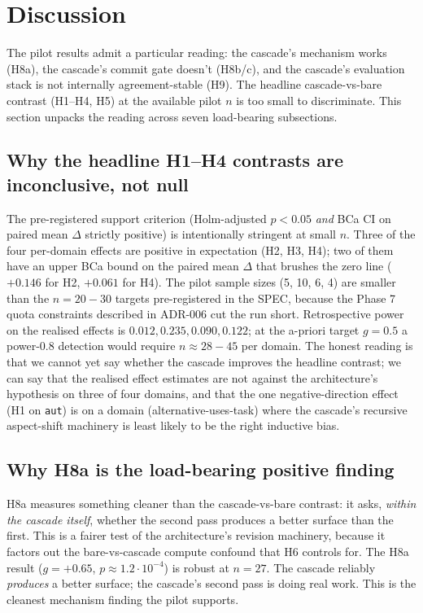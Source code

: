 \section{Discussion}\label{sec:discussion}

\sloppy

The pilot results admit a particular reading: the cascade's mechanism works (H8a), the cascade's commit gate doesn't (H8b/c), and the cascade's evaluation stack is not internally agreement-stable (H9). The headline cascade-vs-bare contrast (H1--H4, H5) at the available pilot $n$ is too small to discriminate. This section unpacks the reading across seven load-bearing subsections.

\subsection{Why the headline H1--H4 contrasts are inconclusive, not null}

The pre-registered support criterion (Holm-adjusted $p<0.05$ \emph{and} BCa CI on paired mean $\Delta$ strictly positive) is intentionally stringent at small $n$. Three of the four per-domain effects are positive in expectation (H2, H3, H4); two of them have an upper BCa bound on the paired mean $\Delta$ that brushes the zero line ($+0.146$ for H2, $+0.061$ for H4). The pilot sample sizes (5, 10, 6, 4) are smaller than the $n=20{-}30$ targets pre-registered in the SPEC, because the Phase 7 quota constraints described in ADR-006 cut the run short. Retrospective power on the realised effects is $0.012, 0.235, 0.090, 0.122$; at the a-priori target $g=0.5$ a power-0.8 detection would require $n\approx 28{-}45$ per domain. The honest reading is that we cannot yet say whether the cascade improves the headline contrast; we can say that the realised effect estimates are not against the architecture's hypothesis on three of four domains, and that the one negative-direction effect (H1 on \texttt{aut}) is on a domain (alternative-uses-task) where the cascade's recursive aspect-shift machinery is least likely to be the right inductive bias.

\subsection{Why H8a is the load-bearing positive finding}

H8a measures something cleaner than the cascade-vs-bare contrast: it asks, \emph{within the cascade itself}, whether the second pass produces a better surface than the first. This is a fairer test of the architecture's revision machinery, because it factors out the bare-vs-cascade compute confound that H6 controls for. The H8a result ($g=+0.65$, $p\approx 1.2\!\cdot\! 10^{-4}$) is robust at $n=27$. The cascade reliably \emph{produces} a better surface; the cascade's second pass is doing real work. This is the cleanest mechanism finding the pilot supports.

